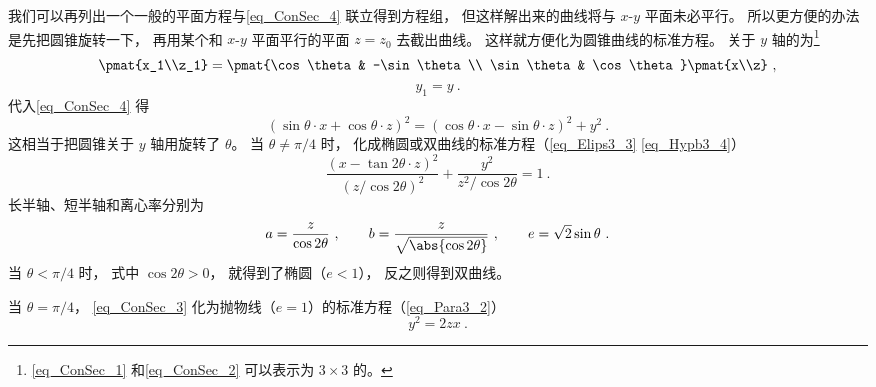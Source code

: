 我们可以再列出一个一般的平面方程与\autoref{eq_ConSec_4} 联立得到方程组， 但这样解出来的曲线将与 $x$-$y$ 平面未必平行。 所以更方便的办法是先把圆锥旋转一下， 再用某个和 $x$-$y$ 平面平行的平面 $z = z_0$ 去截出曲线。 这样就方便化为圆锥曲线的标准方程。 关于 $y$ 轴的为\footnote{\autoref{eq_ConSec_1} 和\autoref{eq_ConSec_2} 可以表示为 $3\times 3$ 的。}
\begin{equation}\label{eq_ConSec_1}
\pmat{x_1\\z_1} = \pmat{\cos\theta & -\sin\theta\\ \sin\theta & \cos\theta}\pmat{x\\z}~,
\end{equation}
\begin{equation}\label{eq_ConSec_2}
y_1 = y~.
\end{equation}
代入\autoref{eq_ConSec_4} 得
\begin{equation}\label{eq_ConSec_3}
(\sin\theta\cdot x + \cos\theta\cdot z)^2 = (\cos\theta\cdot x - \sin\theta\cdot z)^2 + y^2~.
\end{equation}
这相当于把圆锥关于 $y$ 轴用旋转了 $\theta$。 当 $\theta \ne \pi/4$ 时， 化成椭圆或双曲线的标准方程（\autoref{eq_Elips3_3}  \autoref{eq_Hypb3_4}）
\begin{equation}
\frac{(x - \tan2\theta \cdot z)^2}{(z/\cos2\theta)^2} + \frac{y^2}{z^2/\cos2\theta} = 1~.
\end{equation}
长半轴、短半轴和离心率分别为
\begin{equation}
a = \frac{z}{\cos2\theta}~,
\qquad
b = \frac{z}{\sqrt{\abs{\cos2\theta}}}~,
\qquad
e = \sqrt{2}\sin\theta~.
\end{equation}
当 $\theta < \pi/4$ 时， 式中 $\cos2\theta > 0$， 就得到了椭圆（$e < 1$）， 反之则得到双曲线。

当 $\theta = \pi/4$， \autoref{eq_ConSec_3} 化为抛物线（$e = 1$）的标准方程（\autoref{eq_Para3_2}）
\begin{equation}
y^2 = 2zx~.
\end{equation}

